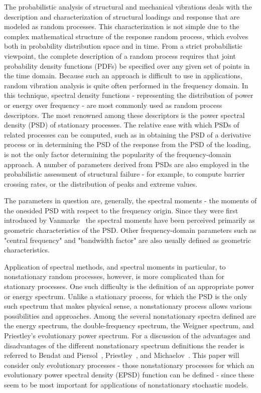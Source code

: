 \documentclass{article}
\begin{document}
The probabilistic analysis of structural and mechanical vibrations deals with
the description and characterization of structural loadings and response that
are modeled as random processes. This characterization is not simple due to
the complex mathematical structure of the response random process, which
evolves both in probability distribution space and in time. From a strict
probabilistic viewpoint, the complete description of a random process requires
that joint probability density functions (PDFs) be specified over any given
set of points in the time domain. Because such an approach is difficult to use
in applications, random vibration analysis is quite often performed in the
frequency domain. In this technique, spectral density functions - representing
the distribution of power or energy over frequency - are most commonly used as
random process descriptors. The most renowned among these descriptors is the
power spectral density (PSD) of stationary processes. The relative ease with
which PSDs of related processes can be computed, such as in obtaining the PSD
of a derivative process or in determining the PSD of the response from the PSD
of the loading, is not the only factor determining the popularity of the
frequency-domain approach. A number of parameters derived from PSDs are also
employed in the probabilistic assessment of structural failure - for example,
to compute barrier crossing rates, or the distribution of peaks and extreme
values.

The parameters in question are, generally, the spectral moments - the moments
of the onesided PSD with respect to the frequency origin. Since they were
first introduced by Vanmarke~{\cite{Vanmarke1972}} the spectral moments have
been perceived primarily as geometric characteristics of the PSD. Other
frequency-domain parameters such as "central frequency" and "bandwidth factor"
are also usually defined as geometric characteristics.

Application of spectral methods, and spectral moments in particular, to
nonstationary random processes, however, is more complicated than for
stationary processes. One such difficulty is the definition of an appropriate
power or energy spectrum. Unlike a stationary process, for which the PSD is
the only such spectrum that makes physical sense, a nonstationary process
allows various possibilities and approaches. Among the several nonstationary
spectra defined are the energy spectrum, the double-frequency spectrum, the
Weigner spectrum, and Priestley's evolutionary power spectrum. For a
discussion of the advantages and disadvantages of the different nonstationary
spectrum definitions the reader is referred to Bendat and
Piersol~{\cite{BendatPiersol1986}}, Priestley~{\cite{Priestley1988}}, and
Michaelov~{\cite{Michaelov1997}}. This paper will consider only evolutionary
processes - those nonstationary processes for which an evolutionary power
spectral density (EPSD) function can be defined - since these seem to be most
important for applications of nonstationary stochastic models.
\end{document}
